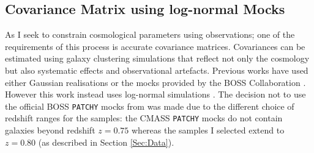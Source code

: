 \subsection{Covariance Matrix using log-normal Mocks}\label{Sec:Cov}
As I seek to constrain cosmological parameters using observations; one of the requirements of this process is accurate covariance matrices. Covariances can be estimated using galaxy clustering simulations that reflect not only the cosmology but also systematic effects and observational artefacts. Previous works have used either Gaussian realisations \citep{Blake2007,Thomas2011,2016Nicola} or the mocks provided by the BOSS Collaboration \citep{2016BOSSMocks,Manera2013}. However this work instead uses log-normal simulations \citep{1991-ColesJones}. The decision not to use the official BOSS \texttt{PATCHY} mocks from \cite{2016BOSSMocks} was made due to the different choice of redshift ranges for the samples: the CMASS \texttt{PATCHY} mocks do not contain galaxies beyond redshift $z = 0.75$ whereas the samples I selected extend to $z = 0.80$ (as described in Section \ref{Sec:Data}). 



